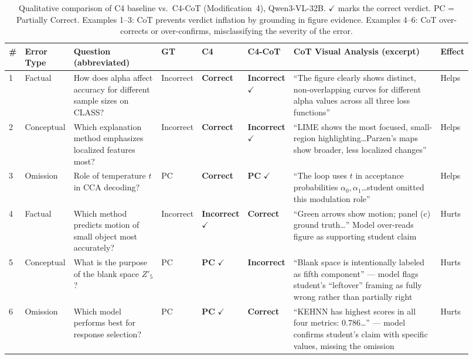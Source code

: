 \documentclass{article}
\begin{document}
\begin{table}[!ht]
\centering
\scriptsize
\setlength{\tabcolsep}{3pt}
\begin{tabular}{@{}p{0.02\linewidth}p{0.07\linewidth}p{0.19\linewidth}p{0.08\linewidth}p{0.09\linewidth}p{0.09\linewidth}p{0.32\linewidth}p{0.06\linewidth}@{}}
\toprule
\# & Error Type & Question (abbreviated) & GT & C4 & C4-CoT & CoT Visual Analysis (excerpt) & Effect \\
\midrule
1 &
Factual &
How does alpha affect accuracy for different sample sizes on CLASS? &
Incorrect &
\textbf{Correct} &
\textbf{Incorrect} $\checkmark$ &
``The figure clearly shows distinct, non-overlapping curves for different alpha values across all three loss functions'' &
Helps \\
\midrule
2 &
Conceptual &
Which explanation method emphasizes localized features most? &
Incorrect &
\textbf{Correct} &
\textbf{Incorrect} $\checkmark$ &
``LIME shows the most focused, small-region highlighting\ldots Parzen's maps show broader, less localized changes'' &
Helps \\
\midrule
3 &
Omission &
Role of temperature $t$ in CCA decoding? &
PC &
\textbf{Correct} &
\textbf{PC} $\checkmark$ &
``The loop uses $t$ in acceptance probabilities $\alpha_0, \alpha_1$\ldots student omitted this modulation role'' &
Helps \\
\midrule
4 &
Factual &
Which method predicts motion of small object most accurately? &
Incorrect &
\textbf{Incorrect} $\checkmark$ &
\textbf{Correct} &
``Green arrows show motion; panel (c) ground truth\ldots'' Model over-reads figure as supporting student claim &
Hurts \\
\midrule
5 &
Conceptual &
What is the purpose of the blank space $Z'_5$? &
PC &
\textbf{PC} $\checkmark$ &
\textbf{Incorrect} &
``Blank space is intentionally labeled as fifth component'' ---
model flags student's ``leftover'' framing as fully wrong rather than partially right &
Hurts \\
\midrule
6 &
Omission &
Which model performs best for response selection? &
PC &
\textbf{PC} $\checkmark$ &
\textbf{Correct} &
``KEHNN has highest scores in all four metrics: 0.786\ldots'' ---
model confirms student's claim with specific values, missing the omission &
Hurts \\
\bottomrule
\end{tabular}
\caption{Qualitative comparison of C4 baseline vs.\ C4-CoT (Modification~4),
Qwen3-VL-32B. $\checkmark$ marks the correct verdict. PC = Partially Correct.
Examples 1--3: CoT prevents verdict inflation by grounding in figure evidence.
Examples 4--6: CoT over-corrects or over-confirms, misclassifying the severity
of the error.}
\label{tab:cot_qual}
\end{table}
\end{document}
